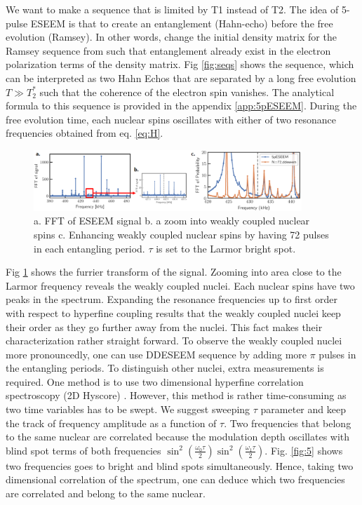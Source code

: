 \documentclass[%
 reprint,
superscriptaddress,
 amsmath,amssymb,
 aps,
]{revtex4-2}
\begin{document}
   
We want to make a sequence that is limited by T1 instead of T2. The idea of 5-pulse ESEEM \cite{kasumaj20085} is that to create an entanglement (Hahn-echo) before the free evolution (Ramsey). In other words, change the initial density matrix for the Ramsey sequence from such that entanglement already exist in the electron polarization terms of the density matrix. Fig \ref{fig:seqs} shows the sequence, which can be interpreted as two Hahn Echos that are separated by a long free evolution $T\gg T_2^\ast$ such that the coherence of the electron spin vanishes. The analytical formula to this sequence is provided in the appendix \ref{app:5pESEEM}. During the free evolution time, each nuclear spins oscillates with either of two resonance frequencies obtained from eq. \ref{eq:H}.
\begin{figure}[htbp]
	\begin{center}
		\includegraphics[width=0.9\textwidth]{pict/fig4.png}
		\caption{a. FFT of ESEEM signal b. a zoom into weakly coupled nuclear spins c. Enhancing weakly coupled nuclear spins by having 72 pulses in each entangling period. $\tau$ is set to the Larmor bright spot.}
		\label{fig:4}
	\end{center}
\end{figure}
Fig \ref{fig:4} shows the furrier transform of the signal. Zooming into area close to the Larmor frequency reveals the weakly coupled nuclei. Each nuclear spins have two peaks in the spectrum. Expanding the resonance frequencies up to first order with respect to hyperfine coupling results that the weakly coupled nuclei keep their order as they go further away from the nuclei. This fact makes their characterization rather straight forward. To observe the weakly coupled nuclei more pronouncedly, one can use DDESEEM sequence by adding more $\pi$ pulses in the entangling periods. To distinguish other nuclei, extra measurements is required. One method is to use two dimensional hyperfine correlation spectroscopy (2D Hyscore)  \cite{vorobyov2022addressing}. However, this method is rather time-consuming as two time variables has to be swept. We suggest sweeping $\tau$ parameter and keep the track of frequency amplitude as a function of $\tau$. Two frequencies that belong to the same nuclear are correlated because the modulation depth oscillates with blind spot terms of both frequencies $\sin^2(\frac{\omega_0 \tau}{2}) \sin^2(\frac{\omega_1 \tau}{2})$. Fig. \ref{fig:5} shows two frequencies goes to bright and blind spots simultaneously. Hence, taking two dimensional correlation of the spectrum, one can deduce which two frequencies are correlated and belong to the same nuclear. \\
\end{document}
